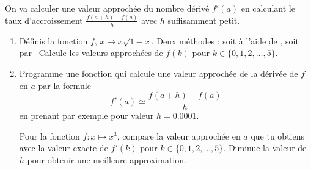 \documentclass[11pt,class=report,crop=false]{standalone}
\begin{document}
\begin{activite}


On va calculer une valeur approchée du nombre dérivé $f'(a)$ en calculant le taux d'accroissement $\frac{f(a+h)-f(a)}{h}$ avec $h$ suffisamment petit.

\begin{enumerate}
  \item Définis la fonction $f$, $x \mapsto x\sqrt{1-x}$.
  Deux méthodes : soit à l'aide de , soit par 
   \ 
  Calcule les valeurs approchées de $f(k)$ pour $k \in \{0,1,2,\ldots,5\}$.
  
  \item Programme une fonction  qui calcule une valeur approchée de la dérivée de $f$ en $a$ par la formule
  $$f'(a) \simeq \frac{f(a+h)-f(a)}{h}$$
  en prenant par exemple pour valeur $h=0.0001$.
  
  
  Pour la fonction $f : x\mapsto x^3$, compare 
  la valeur approchée en $a$ que tu obtiens avec la valeur exacte de $f'(k)$ pour $k \in \{0,1,2,\ldots,5\}$.  
  Diminue la valeur de $h$ pour obtenir une meilleure approximation.
  
\end{enumerate} 

\end{activite}


\end{document}
